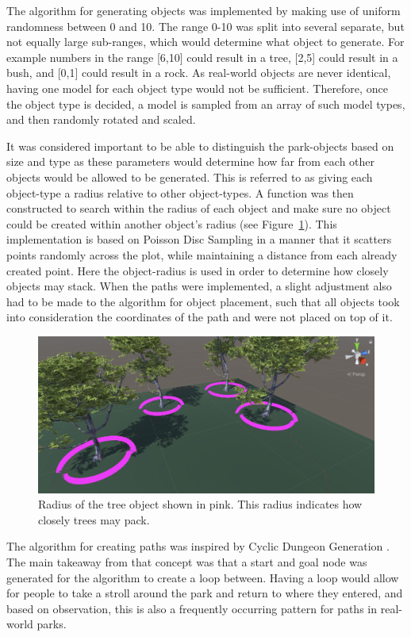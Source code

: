 The algorithm for generating objects was implemented by making use of uniform randomness between 0 and 10.
The range 0-10 was split into several separate, but not equally large sub-ranges, which would determine what object to generate.
For example numbers in the range [6,10] could result in a tree, [2,5] could result in a bush, and [0,1] could result in a rock.
As real-world objects are never identical, having one model for each object type would not be sufficient. 
Therefore, once the object type is decided, a model is sampled from an array of such model types, and then randomly rotated and scaled. 

It was considered important to be able to distinguish the park-objects based on size and type as these parameters would determine how far from each other objects would be allowed to be generated.
This is referred to as giving each object-type a radius relative to other object-types.
A function was then constructed to search within the radius of each object and make sure no object could be created within another object's radius (see Figure~\ref{fig:radius}).
This implementation is based on Poisson Disc Sampling \cite{poisson_fast} in a manner that it scatters points randomly across the plot, while maintaining a distance from each already created point.
Here the object-radius is used in order to determine how closely objects may stack. 
When the paths were implemented, a slight adjustment also had to be made to the algorithm for object placement, such that all objects took into consideration the coordinates of the path and were not placed on top of it.
\begin{figure}[H]
\includegraphics[width=\linewidth]{figure/radiuscontrol.png}
\caption{Radius of the tree object shown in pink. This radius indicates how closely trees may pack.}
\label{fig:radius}
\end{figure}

The algorithm for creating paths was inspired by Cyclic Dungeon Generation \cite{cyclic}.
The main takeaway from that concept was that a start and goal node was generated for the algorithm to create a loop between.
Having a loop would allow for people to take a stroll around the park and return to where they entered, and based on observation, this is also a frequently occurring pattern for paths in real-world parks. 

